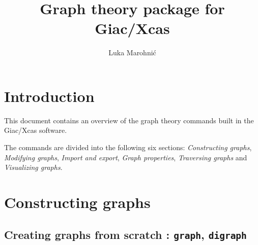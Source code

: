 \documentclass[a4paper,11pt]{article}
\title{Graph theory package for Giac/Xcas}
\author{Luka Marohnić}
\begin{document}
\maketitle
\tableofcontents

\section{Introduction}

This document contains an overview of the graph theory commands built in the Giac/Xcas software.

The commands are divided into the following six sections: \emph{Constructing graphs}, \emph{Modifying graphs}, \emph{Import and export}, \emph{Graph properties}, \emph{Traversing graphs} and \emph{Visualizing graphs}.

\section{Constructing graphs}

\subsection{Creating graphs from scratch : {\tt graph}, {\tt digraph}}
\end{document}
